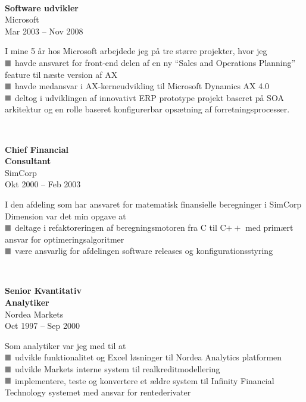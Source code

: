 \documentclass[10pt, a4paper]{article}
\newcommand*{\greysquare}{\textcolor{gray}{\blacksquare}}
\begin{document}
\\[0.5cm]
\begin{Row}%
  \begin{Cell}{1}
    \textbf{Software udvikler} \\ [1ex]
    Microsoft \\
    Mar 2003 -- Nov 2008 %
  \end{Cell}
  \begin{Cell}{3}
    I mine 5 år hos Microsoft arbejdede jeg på tre større projekter, hvor
    jeg \\ [1ex]
    $\greysquare$ havde ansvaret for front-end delen af en ny ``Sales and
    Operations Planning'' feature til næste version af AX \\
    $\greysquare$ havde medansvar i AX-kerneudvikling til Microsoft Dynamics AX
    4.0 \\
    $\greysquare$ deltog i udviklingen af innovativt ERP prototype projekt
    baseret på SOA arkitektur og en rolle baseret konfigurerbar opsætning af
    forretningsprocesser.
  \end{Cell}
\end{Row}
\\[0.5cm]
\begin{Row}%
  \begin{Cell}{1}
    \textbf{Chief Financial \\
    Consultant} \\ [1ex]
    SimCorp \\
    Okt 2000 -- Feb 2003 %
  \end{Cell}
  \begin{Cell}{3}
    I den afdeling som har ansvaret for matematisk finansielle beregninger i
    SimCorp Dimension var det min opgave at \\ [1ex]
    $\greysquare$ deltage i refaktoreringen af beregningsmotoren fra C til C$++$
    med primært ansvar for optimeringsalgoritmer \\
    $\greysquare$ være ansvarlig for afdelingen software releases og
    konfigurationsstyring
  \end{Cell}
\end{Row}
\\[0.5cm]
\begin{Row}%
  \begin{Cell}{1}
    \textbf{Senior Kvantitativ \\
    Analytiker} \\ [1ex]
    Nordea Markets \\
    Oct 1997 -- Sep 2000 %
  \end{Cell}
  \begin{Cell}{3}
    Som analytiker var jeg med til at \\ [1ex]
    $\greysquare$ udvikle funktionalitet og Excel løsninger til Nordea Analytics
    platformen \\
    $\greysquare$ udvikle Markets interne system til realkreditmodellering \\
    $\greysquare$ implementere, teste og konvertere et ældre system til Infinity
    Financial Technology systemet med ansvar for rentederivater
  \end{Cell}
\end{Row}
\end{document}
